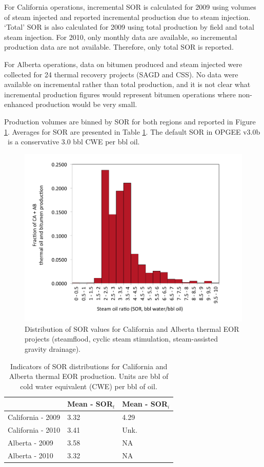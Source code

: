 \documentclass[11pt]{report}
\newcommand{\version}{v3.0b }
\begin{document}
For California operations, incremental SOR is calculated for 2009 using volumes of steam injected and reported incremental production due to steam injection. `Total' SOR is also calculated for 2009 using total production by field and total steam injection. For 2010, only monthly data are available, so incremental production data are not available. Therefore, only total SOR is reported.

For Alberta operations, data on bitumen produced and steam injected were collected for 24 thermal recovery projects (SAGD and CSS). No data were available on incremental rather than total production, and it is not clear what incremental production figures would represent bitumen operations where non-enhanced production would be very small.

Production volumes are binned by SOR for both regions and reported in Figure \ref{fig:SOR_dist}. Averages for SOR are presented in Table \ref{tab:SOR_stats}.  The default SOR in OPGEE \version \, is a conservative 3.0 bbl CWE per bbl oil. 

\begin{figure}[t]
\includegraphics[width=0.85\columnwidth]{images/SOR_dist.pdf}
\caption{Distribution of SOR values for California and Alberta thermal EOR projects (steamflood, cyclic steam stimulation, steam-assisted gravity drainage).}
\label{fig:SOR_dist}
\end{figure}


\begin{table}
\caption{Indicators of SOR distributions for California and Alberta thermal EOR production. Units are bbl of cold water equivalent (CWE) per bbl of oil.}
\label{tab:SOR_stats}
\begin{scriptsize}
\begin{tabularx}{1\columnwidth}{p{}p{}p{}}
\toprule
& Mean - SOR$_t$ & Mean - SOR$_i$ \\
\midrule
California - 2009 & 3.32 & 4.29 \\
California - 2010 & 3.41 & Unk. \\
Alberta - 2009 & 3.58 & NA \\
Alberta - 2010 & 3.32 & NA \\
\bottomrule
\end{tabularx}
\end{scriptsize}
\end{table}
\end{document}
